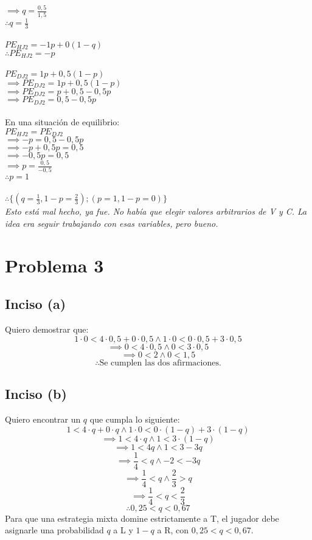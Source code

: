 \documentclass{article}
\begin{document}
            \(\implies q = \frac{0,5}{1,5}\) \\
            \(\therefore q = \frac{1}{3}\) \\
            \\
            \(PE_{HJ2} = -1p + 0(1-q)\) \\
            \(\therefore PE_{HJ2} = -p\) \\
            \\
            \(PE_{DJ2} = 1p + 0,5(1-p)\) \\
            \(\implies PE_{DJ2} = 1p + 0,5(1-p)\) \\
            \(\implies PE_{DJ2} = p + 0,5-0,5p\) \\
            \(\implies PE_{DJ2} = 0,5-0,5p\) \\
            \\
            En una situación de equilibrio: \\
            \(PE_{HJ2} = PE_{DJ2}\) \\
            \(\implies -p = 0,5-0,5p\) \\
            \(\implies -p+0,5p = 0,5\) \\
            \(\implies -0,5p = 0,5\) \\
            \(\implies p = \frac{0,5}{-0,5}\) \\
            \(\therefore p = 1\) \\
            \\
            \(\therefore \{(q = \frac{1}{3}, 1-p = \frac{2}{3}); (p = 1, 1-p = 0)\}\) \\
            \textit{Esto está mal hecho, ya fue. No había que elegir valores arbitrarios de V y C. La idea era seguir trabajando con esas variables, pero bueno.}
    \section*{Problema 3}
        \subsection*{Inciso (a)}
            Quiero demostrar que:
            \[1 \cdot 0 < 4 \cdot 0,5 + 0 \cdot 0,5 \wedge 1 \cdot 0 < 0 \cdot 0,5 + 3 \cdot 0,5\]
            \[\implies 0 < 4 \cdot 0,5 \wedge 0 < 3 \cdot 0,5\]
            \[\implies 0 < 2 \wedge 0 < 1,5\]
            \[\therefore \text{Se cumplen las dos afirmaciones.}\]
        \subsection*{Inciso (b)}
            Quiero encontrar un $q$ que cumpla lo siguiente:
            \[1 < 4 \cdot q + 0 \cdot q \wedge 1 \cdot 0 < 0 \cdot (1-q) + 3 \cdot (1-q)\]
            \[\implies 1 < 4 \cdot q \wedge 1 < 3 \cdot (1-q)\]
            \[\implies 1 < 4q \wedge 1 < 3-3q\]
            \[\implies \frac{1}{4} < q \wedge -2 < -3q\]
            \[\implies \frac{1}{4} < q \wedge \frac{2}{3} > q\]
            \[\implies \frac{1}{4} < q < \frac{2}{3}\]
            \[\therefore 0,25 < q < 0,67\]
            Para que una estrategia mixta domine estrictamente a T, el jugador debe asignarle una probabilidad $q$ a L y $1-q$ a R, con \(0,25 < q < 0,67\).
\end{document}
